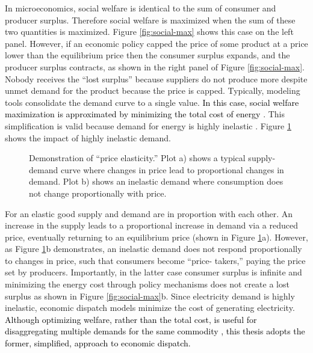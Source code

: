 In microeconomics, social welfare is identical to the sum of consumer and producer 
surplus. Therefore social welfare is maximized when the sum of these two quantities is
maximized. Figure \ref{fig:social-max} shows this case on the left panel. However, if an 
economic policy capped the price of some product at a price lower than the equilibrium 
price then the consumer surplus expands, and the producer surplus contracts, as shown in 
the right panel of Figure \ref{fig:social-max}. Nobody receives the ``lost surplus'' 
because suppliers do not produce more despite unmet demand for the product because the 
price is capped. Typically, modeling tools consolidate the demand curve to a single 
value. \textcolor{black}{In this case, social welfare maximization is approximated by 
minimizing the total cost of energy \cite{richstein_cross-border_2014}}. This simplification 
is valid because demand for energy is highly inelastic \cite{heuberger_power_2017,
eia_price_2021, labandeira_meta-analysis_2017, csereklyei_price_2020}. Figure \ref{fig:inelastic}
shows the impact of highly inelastic demand.

\begin{figure}[H]
  \centering
  \resizebox{\columnwidth}{!}{}
  \caption{Demonstration of ``price elasticity.'' Plot a) shows a typical supply-demand curve where changes in price lead to proportional changes in demand. Plot b) shows an inelastic demand where consumption does not change proportionally with price.}
  \label{fig:inelastic}
\end{figure}

For an elastic good supply and demand are in proportion with each other. An increase 
in the supply leads to a proportional increase in demand via a reduced price, 
eventually returning to an equilibrium price (shown in Figure \ref{fig:inelastic}a). 
However, as Figure \ref{fig:inelastic}b demonstrates, an inelastic demand does not 
respond proportionally to changes in price, such that consumers become ``price-
takers,'' paying the price set by producers. Importantly, in the latter case 
consumer surplus is infinite and minimizing the energy cost through policy 
mechanisms does not create a lost surplus as shown in Figure \ref{fig:social-max}b. 
Since electricity demand is highly inelastic, economic dispatch models minimize the 
cost of generating electricity. \textcolor{black}{Although optimizing welfare, 
rather than the total cost, is useful for disaggregating multiple demands for the 
same commodity \cite{leuthold_elmod_2008}, this thesis adopts the former, simplified, approach 
to economic dispatch.}

